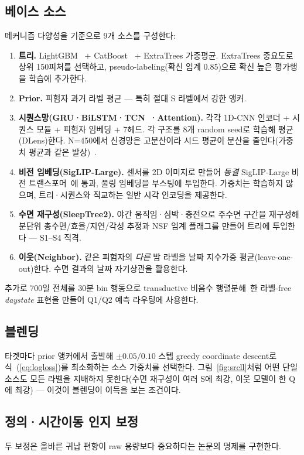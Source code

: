 \documentclass[conference]{IEEEtran}
\begin{document}
\subsection{베이스 소스}
메커니즘 다양성을 기준으로 9개 소스를 구성한다:
\begin{enumerate}
\item \textbf{트리.} LightGBM~\cite{lightgbm} + CatBoost~\cite{catboost} + ExtraTrees 가중평균.
ExtraTrees 중요도로 상위 150피처를 선택하고, pseudo-labeling(확신 임계 $0.85$)으로 확신 높은 평가행을
학습에 추가한다.
\item \textbf{Prior.} 피험자 과거 라벨 평균 — 특히 절대 S 라벨에서 강한 앵커.
\item \textbf{시퀀스망(GRU·BiLSTM·TCN~\cite{tcn}·Attention).} 각각 1D-CNN 인코더 + 시퀀스 모듈 + 피험자
임베딩 + 7헤드. 각 구조를 8개 random seed로 학습해 평균(DLens)한다. N=450에서 신경망은 고분산이라 시드
평균이 분산을 줄인다(가중치 평균과 같은 발상)~\cite{swa}.
\item \textbf{비전 임베딩(SigLIP-Large).} 센서를 2D 이미지로 만들어 \emph{동결} SigLIP-Large 비전
트랜스포머~\cite{siglip}에 통과, 풀링 임베딩을 부스팅에 투입한다. 가중치는 학습하지 않으며, 트리·시퀀스와
직교하는 일반 시각 인코딩을 제공한다.
\item \textbf{수면 재구성(SleepTree2).} 야간 움직임·심박·충전으로 주수면 구간을 재구성해 분단위 총수면/효율/지연/각성
추정과 NSF 임계 플래그를 만들어 트리에 투입한다 — S1--S4 직격.
\item \textbf{이웃(Neighbor).} 같은 피험자의 \emph{다른} 밤 라벨을 날짜 지수가중 평균(leave-one-out)한다.
수면 결과의 날짜 자기상관을 활용한다.
\end{enumerate}
추가로 700일 전체를 30분 bin 행동으로 transductive 비음수 행렬분해~\cite{nmf}한 라벨-free
\emph{daystate} 표현을 만들어 Q1/Q2 예측 라우팅에 사용한다.

\subsection{블렌딩}
타겟마다 prior 앵커에서 출발해 $\pm 0.05/0.10$ 스텝 greedy coordinate descent로 식~(\ref{eq:logloss})를
최소화하는 소스 가중치를 선택한다. 그림~\ref{fig:srcll}처럼 어떤 단일 소스도 모든 라벨을 지배하지 못한다(수면
재구성이 여러 S에 최강, 이웃 모델이 한 Q에 최강) — 이것이 블렌딩이 이득을 보는 조건이다.

\subsection{정의·시간이동 인지 보정}
두 보정은 올바른 귀납 편향이 raw 용량보다 중요하다는 논문의 명제를 구현한다.
\end{document}
